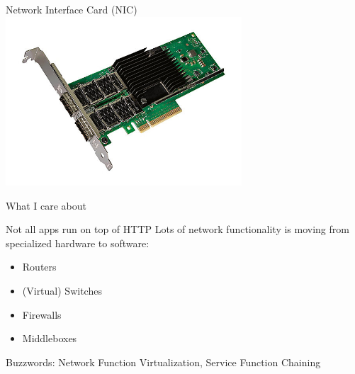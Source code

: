 \documentclass[NET,english,aspectratio=169]{tumbeamer}
\begin{document}
\begin{frame}{Network Interface Card (NIC)}
\centering\includegraphics[width=0.66\textwidth]{pics/nic3}
\end{frame}


\begin{frame}{What I care about}
\centering{}
\end{frame}


\begin{frame}{Not all apps run on top of HTTP}
Lots of network functionality is moving from specialized hardware to software:
\begin{itemize}
\item Routers
\item (Virtual) Switches
\item Firewalls
\item Middleboxes
\end{itemize}
Buzzwords: Network Function Virtualization, Service Function Chaining
\end{frame}
\end{document}
